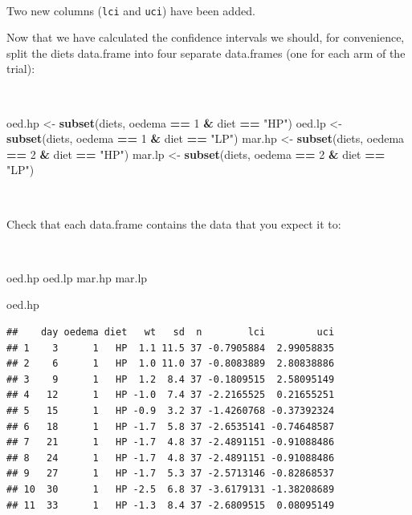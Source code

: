\documentclass[12pt,a4paper]{book}
\newenvironment{Shaded}{\begin{snugshade}}{\end{snugshade}}
\newcommand{\KeywordTok}[1]{\textcolor[rgb]{0.13,0.29,0.53}{\textbf{#1}}}
\newcommand{\DecValTok}[1]{\textcolor[rgb]{0.00,0.00,0.81}{#1}}
\newcommand{\StringTok}[1]{\textcolor[rgb]{0.31,0.60,0.02}{#1}}
\newcommand{\OperatorTok}[1]{\textcolor[rgb]{0.81,0.36,0.00}{\textbf{#1}}}
\newcommand{\NormalTok}[1]{#1}
\theoremstyle{definition}
\theoremstyle{definition}
\theoremstyle{definition}
\theoremstyle{remark}
\begin{document}
~

Two new columns (\texttt{lci} and \texttt{uci}) have been added.

Now that we have calculated the confidence intervals we should, for
convenience, split the diets data.frame into four separate data.frames
(one for each arm of the trial):

~

\begin{Shaded}
\begin{Highlighting}[]
\NormalTok{oed.hp <-}\StringTok{ }\KeywordTok{subset}\NormalTok{(diets, oedema }\OperatorTok{==}\StringTok{ }\DecValTok{1} \OperatorTok{&}\StringTok{ }\NormalTok{diet }\OperatorTok{==}\StringTok{ "HP"}\NormalTok{)}
\NormalTok{oed.lp <-}\StringTok{ }\KeywordTok{subset}\NormalTok{(diets, oedema }\OperatorTok{==}\StringTok{ }\DecValTok{1} \OperatorTok{&}\StringTok{ }\NormalTok{diet }\OperatorTok{==}\StringTok{ "LP"}\NormalTok{)}
\NormalTok{mar.hp <-}\StringTok{ }\KeywordTok{subset}\NormalTok{(diets, oedema }\OperatorTok{==}\StringTok{ }\DecValTok{2} \OperatorTok{&}\StringTok{ }\NormalTok{diet }\OperatorTok{==}\StringTok{ "HP"}\NormalTok{)}
\NormalTok{mar.lp <-}\StringTok{ }\KeywordTok{subset}\NormalTok{(diets, oedema }\OperatorTok{==}\StringTok{ }\DecValTok{2} \OperatorTok{&}\StringTok{ }\NormalTok{diet }\OperatorTok{==}\StringTok{ "LP"}\NormalTok{)}
\end{Highlighting}
\end{Shaded}

~

Check that each data.frame contains the data that you expect it to:

~

\begin{Shaded}
\begin{Highlighting}[]
\NormalTok{oed.hp}
\NormalTok{oed.lp}
\NormalTok{mar.hp}
\NormalTok{mar.lp}
\end{Highlighting}
\end{Shaded}

\newpage

\begin{Shaded}
\begin{Highlighting}[]
\NormalTok{oed.hp}
\end{Highlighting}
\end{Shaded}

\begin{verbatim}
##    day oedema diet   wt   sd  n        lci         uci
## 1    3      1   HP  1.1 11.5 37 -0.7905884  2.99058835
## 2    6      1   HP  1.0 11.0 37 -0.8083889  2.80838886
## 3    9      1   HP  1.2  8.4 37 -0.1809515  2.58095149
## 4   12      1   HP -1.0  7.4 37 -2.2165525  0.21655251
## 5   15      1   HP -0.9  3.2 37 -1.4260768 -0.37392324
## 6   18      1   HP -1.7  5.8 37 -2.6535141 -0.74648587
## 7   21      1   HP -1.7  4.8 37 -2.4891151 -0.91088486
## 8   24      1   HP -1.7  4.8 37 -2.4891151 -0.91088486
## 9   27      1   HP -1.7  5.3 37 -2.5713146 -0.82868537
## 10  30      1   HP -2.5  6.8 37 -3.6179131 -1.38208689
## 11  33      1   HP -1.3  8.4 37 -2.6809515  0.08095149
\end{verbatim}
\end{document}
